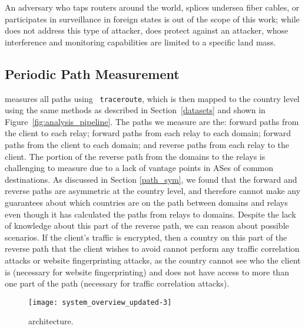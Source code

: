 An adversary who taps routers around the world, splices undersea fiber cables, or participates in 
surveillance in foreign states is out of the scope of this work; while \system{} does not address this 
type of attacker, \system{} does protect against an attacker, whose interference and monitoring 
capabilities are limited to a specific land mass.



\subsection{Periodic Path Measurement}

\system{} measures all paths using {\tt 
traceroute}, which is then mapped to the country level using the same methods as 
described in Section~\ref{datasets} and shown in Figure~\ref{fig:analysis_pipeline}.
The paths we measure are the: forward paths from 
the client to each relay; forward paths from each relay to each domain; forward
paths from the client to each domain; and reverse paths from each relay to the 
client. 
The portion of the reverse path from the domains to the relays is
challenging to measure due to a lack of vantage points in ASes of common
destinations. As discussed in Section \ref{path_sym}, we found that  the
forward and reverse paths are asymmetric at the country level, and therefore
\system{} cannot make any guarantees about which countries are on the path
between  domains and relays even though it has calculated the paths from
relays to domains.   Despite the lack of knowledge about this part of the
reverse path,  we can reason about possible scenarios.  If the client's
traffic is encrypted, then a country on this part of
the reverse path that the client wishes to avoid cannot perform any  traffic correlation
attacks or website
fingerprinting attacks, as the country cannot see who the client is (necessary
for website fingerprinting) and does not have access to more than one part of
the path (necessary for traffic correlation attacks).

\begin{figure}[t!]
    \centering
        \texttt{[image: system\_overview\_updated-3]}
        \caption{\system{} architecture.}
        \label{fig:arch}
\end{figure}


